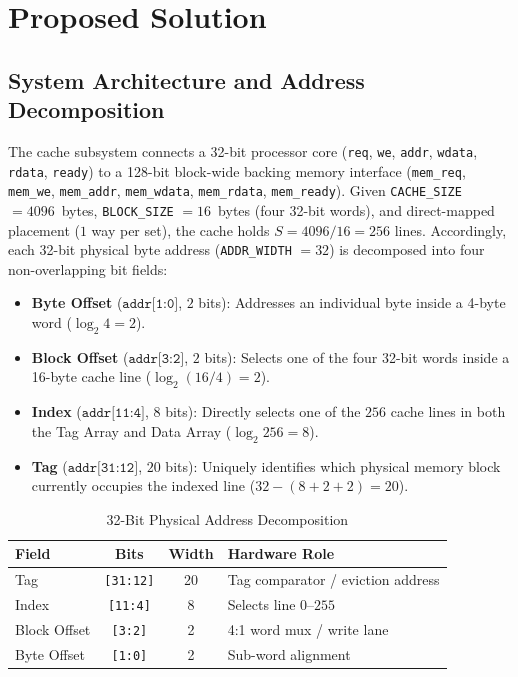 \documentclass[conference]{IEEEtran}
\begin{document}
\section{Proposed Solution}
\subsection{System Architecture and Address Decomposition}
The cache subsystem connects a 32-bit processor core (\texttt{req}, \texttt{we}, \texttt{addr}, \texttt{wdata}, \texttt{rdata}, \texttt{ready}) to a 128-bit block-wide backing memory interface (\texttt{mem\_req}, \texttt{mem\_we}, \texttt{mem\_addr}, \texttt{mem\_wdata}, \texttt{mem\_rdata}, \texttt{mem\_ready}). Given \texttt{CACHE\_SIZE} $= 4096$~bytes, \texttt{BLOCK\_SIZE} $= 16$~bytes (four 32-bit words), and direct-mapped placement ($1$ way per set), the cache holds $S = 4096 / 16 = 256$ lines. Accordingly, each 32-bit physical byte address (\texttt{ADDR\_WIDTH} $= 32$) is decomposed into four non-overlapping bit fields:
\begin{itemize}
    \item \textbf{Byte Offset} ($\texttt{addr[1:0]}$, $2$ bits): Addresses an individual byte inside a 4-byte word ($\log_2 4 = 2$).
    \item \textbf{Block Offset} ($\texttt{addr[3:2]}$, $2$ bits): Selects one of the four 32-bit words inside a 16-byte cache line ($\log_2(16/4) = 2$).
    \item \textbf{Index} ($\texttt{addr[11:4]}$, $8$ bits): Directly selects one of the $256$ cache lines in both the Tag Array and Data Array ($\log_2 256 = 8$).
    \item \textbf{Tag} ($\texttt{addr[31:12]}$, $20$ bits): Uniquely identifies which physical memory block currently occupies the indexed line ($32 - (8 + 2 + 2) = 20$).
\end{itemize}

\begin{table}[htbp]
\caption{32-Bit Physical Address Decomposition}
\begin{center}
\begin{tabular}{|l|c|c|p{3.1cm}|}
\hline
\textbf{Field} & \textbf{Bits} & \textbf{Width} & \textbf{Hardware Role} \\
\hline
Tag & \texttt{[31:12]} & 20 & Tag comparator / eviction address \\
\hline
Index & \texttt{[11:4]} & 8 & Selects line $0$--$255$ \\
\hline
Block Offset & \texttt{[3:2]} & 2 & 4:1 word mux / write lane \\
\hline
Byte Offset & \texttt{[1:0]} & 2 & Sub-word alignment \\
\hline
\end{tabular}
\label{tab:addr_split}
\end{center}
\end{table}
\end{document}
